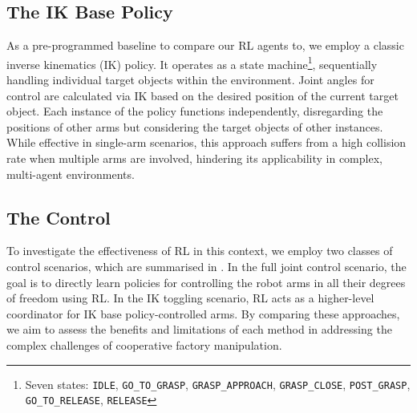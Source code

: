 \documentclass[conference,a4paper]{IEEEtran}
\begin{document}
\subsection{The IK Base Policy}

As a pre-programmed baseline to compare our RL agents to, we employ a classic inverse kinematics (IK) policy.
It operates as a state machine\footnote{Seven states: \texttt{IDLE}, \texttt{GO\_TO\_GRASP}, \texttt{GRASP\_APPROACH}, \texttt{GRASP\_CLOSE}, \texttt{POST\_GRASP}, \texttt{GO\_TO\_RELEASE}, \texttt{RELEASE}}, sequentially handling individual target objects within the environment. 
Joint angles for control are calculated via IK based on the desired position of the current target object.
Each instance of the policy functions independently, disregarding the positions of other arms but considering the target objects of other instances. 
While effective in single-arm scenarios, this approach suffers from a high collision rate when multiple arms are involved, hindering its applicability in complex, multi-agent environments.

\subsection{The Control}

To investigate the effectiveness of RL in this context, we employ two classes of control scenarios, which are summarised in .
In the full joint control scenario, the goal is to directly learn policies for controlling the robot arms in all their degrees of freedom using RL. 
In the IK toggling scenario, RL acts as a higher-level coordinator for IK base policy-controlled arms. 
By comparing these approaches, we aim to assess the benefits and limitations of each method in addressing the complex challenges of cooperative factory manipulation.
\end{document}
